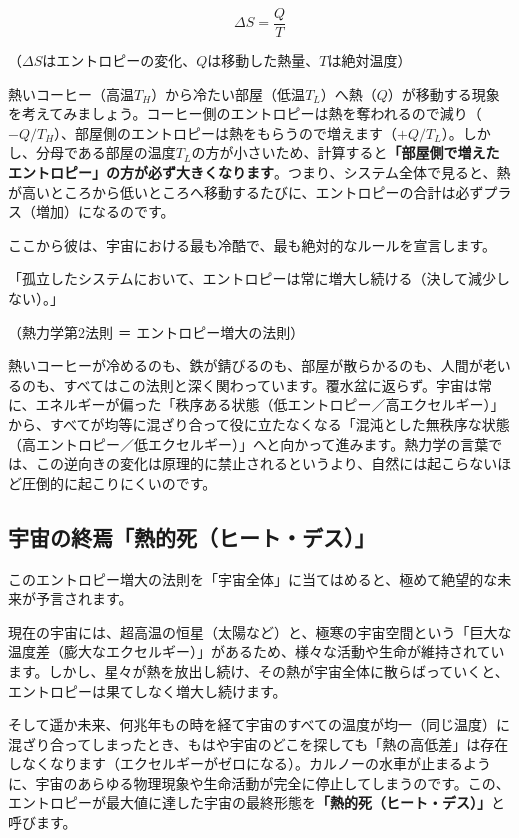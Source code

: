 \[
\Delta S=\frac{Q}{T}
\]

（\(\Delta S\)はエントロピーの変化、\(Q\)は移動した熱量、\(T\)は絶対温度）

熱いコーヒー（高温\(T_H\)）から冷たい部屋（低温\(T_L\)）へ熱（\(Q\)）が移動する現象を考えてみましょう。コーヒー側のエントロピーは熱を奪われるので減り（\(-Q/T_H\)）、部屋側のエントロピーは熱をもらうので増えます（\(+Q/T_L\)）。しかし、分母である部屋の温度\(T_L\)の方が小さいため、計算すると\textbf{「部屋側で増えたエントロピー」の方が必ず大きくなります}。つまり、システム全体で見ると、熱が高いところから低いところへ移動するたびに、エントロピーの合計は必ずプラス（増加）になるのです。

ここから彼は、宇宙における最も冷酷で、最も絶対的なルールを宣言します。

「孤立したシステムにおいて、エントロピーは常に増大し続ける（決して減少しない）。」

（熱力学第2法則 ＝ エントロピー増大の法則）

熱いコーヒーが冷めるのも、鉄が錆びるのも、部屋が散らかるのも、人間が老いるのも、すべてはこの法則と深く関わっています。覆水盆に返らず。宇宙は常に、エネルギーが偏った「秩序ある状態（低エントロピー／高エクセルギー）」から、すべてが均等に混ざり合って役に立たなくなる「混沌とした無秩序な状態（高エントロピー／低エクセルギー）」へと向かって進みます。熱力学の言葉では、この逆向きの変化は原理的に禁止されるというより、自然には起こらないほど圧倒的に起こりにくいのです。

\subsection{宇宙の終焉「熱的死（ヒート・デス）」}

このエントロピー増大の法則を「宇宙全体」に当てはめると、極めて絶望的な未来が予言されます。

現在の宇宙には、超高温の恒星（太陽など）と、極寒の宇宙空間という「巨大な温度差（膨大なエクセルギー）」があるため、様々な活動や生命が維持されています。しかし、星々が熱を放出し続け、その熱が宇宙全体に散らばっていくと、エントロピーは果てしなく増大し続けます。

そして遥か未来、何兆年もの時を経て宇宙のすべての温度が均一（同じ温度）に混ざり合ってしまったとき、もはや宇宙のどこを探しても「熱の高低差」は存在しなくなります（エクセルギーがゼロになる）。カルノーの水車が止まるように、宇宙のあらゆる物理現象や生命活動が完全に停止してしまうのです。この、エントロピーが最大値に達した宇宙の最終形態を\textbf{「熱的死（ヒート・デス）」}と呼びます。

